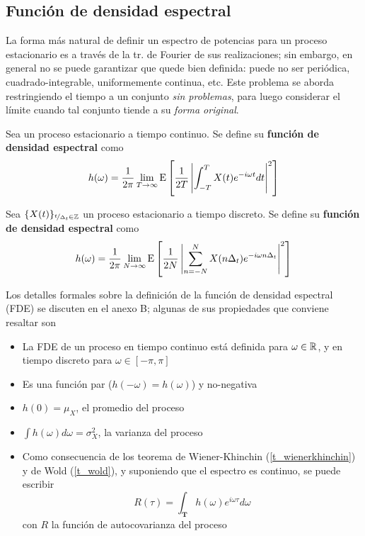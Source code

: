 
\subsection{Función de densidad espectral}

La forma más natural de definir un espectro de potencias para un proceso estacionario 
es a través de la tr. de Fourier de sus realizaciones; sin embargo, en general no se puede 
garantizar que quede bien definida: puede no ser periódica, cuadrado-integrable, uniformemente 
continua, etc.
%
Este problema se aborda restringiendo el tiempo a un conjunto \textit{sin problemas}, para luego
considerar el límite cuando tal conjunto tiende a su \textit{forma original}.

\begin{definicion}%
Sea \xt un proceso estacionario a tiempo continuo. Se define su \textbf{función de densidad 
espectral} como
\begin{equation}
h(\omega) = \frac{1}{2 \pi} \lim_{T\rightarrow \infty} \mathrm{E}\left[  \frac{1}{2T} 
\left|  \int_{-T}^{T} X(t) e^{-i \omega t} dt \right|^{2}  \right]
\label{txt_FDE_cont}
\end{equation}
\end{definicion}

\begin{definicion}%
Sea $\{X(t)\}_{\nicefrac{t}{\Delta_t}\in \mathbb{Z}}$ un proceso estacionario a tiempo discreto. Se 
define su \textbf{función de densidad espectral} como
\begin{equation}
h(\omega) = \frac{1}{2 \pi} \lim_{N\rightarrow \infty} \mathrm{E}\left[  \frac{1}{2N} 
\left|  \sum_{n=-N}^{N} X(n \Delta_t) e^{-i \omega n \Delta_t} \right|^{2}  \right]
\label{txt_FDE_disc}
\end{equation}
\end{definicion}

Los detalles formales sobre la definición de la función de densidad espectral (FDE) se discuten en 
el anexo B; algunas de sus propiedades que conviene resaltar son 
\begin{itemize}
\item La FDE de un proceso en tiempo continuo está definida para $\omega \in \mathbb{R}$, y en tiempo
discreto para $\omega \in [-\pi,\pi]$
\item Es una función par ($h(-\omega) = h(\omega)$) y no-negativa
\item $h(0) = \mu_X$, el promedio del proceso
\item $\int h(\omega) d\omega = \sigma^{2}_X$, la varianza del proceso %
\item Como consecuencia de los teorema de Wiener-Khinchin (\ref{t_wienerkhinchin}) y de Wold
(\ref{t_wold}), y suponiendo que el espectro es continuo, se puede escribir
\begin{equation}
R(\tau) = \int_{\boldsymbol{T}} h(\omega) e^{i \omega \tau} d\omega
\label{txt_r_ft_h}
\end{equation}
con $R$ la función de autocovarianza del proceso
\end{itemize}

